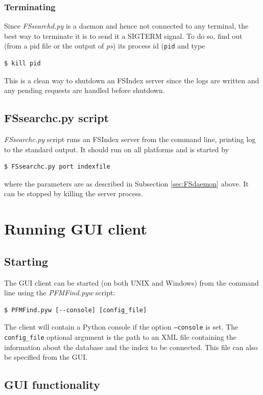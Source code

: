\documentclass[10pt,letter]{article}
\begin{document}
\subsubsection{Terminating}

Since \textit{FSsearchd.py} is a daemon and hence not connected to any terminal, the best way to terminate it is to send it a SIGTERM signal. To do so, find out (from a pid file or the output of \textit{ps}) its process id (\texttt{pid} and type
\begin{verbatim}
$ kill pid
\end{verbatim}
This is a clean way to shutdown an FSIndex server since the logs are written and any pending requests are handled before shutdown.

\subsection{FSsearchc.py script}\label{sec:FSscript}

\textit{FSsearchc.py} script runs an FSIndex server from the command line, printing log to the standard output. It should run on all platforms and is started by
\begin{verbatim}
$ FSsearchc.py port indexfile
\end{verbatim}
where the parameters are as described in Subsection \ref{sec:FSdaemon} above. It can be stopped by killing the server process.

\section{Running GUI client}

\subsection{Starting}

The GUI client can be started (on both UNIX and Windows) from the command line using the \textit{PFMFind.pyw} script:
\begin{verbatim}
$ PFMFind.pyw [--console] [config_file]
\end{verbatim}

The client will contain a Python console if the option \texttt{--console} is set. The \texttt{config\_file} optional argument is the path to an XML file containing the information about the database and the index to be connected. This file can also be specified from the GUI.

\subsection{GUI functionality}
\end{document}
